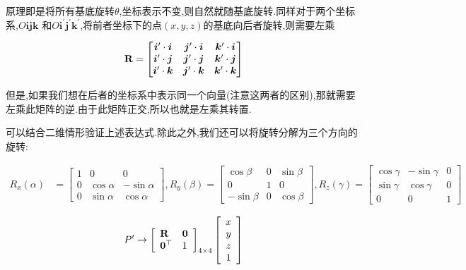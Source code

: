 原理即是将所有基底旋转$\theta$,坐标表示不变,则自然就随基底旋转.同样对于两个坐标系,$O\bm i \bm j \bm k$
和$O \bm i^\prime \bm j^\prime \bm k^\prime$,将前者坐标下的点$(x, y, z)$的基底向后者旋转,则需要左乘

\begin{equation}
	\bold{R} = \begin{bmatrix}
		\bm i^\prime \cdot \bm i  & \bm j^\prime \cdot \bm i & \bm k^\prime \cdot \bm i
		\\
		\bm i^\prime \cdot \bm j  & \bm j^\prime \cdot \bm j & \bm k^\prime \cdot \bm j
		\\
		\bm i^\prime \cdot \bm k  & \bm j^\prime \cdot \bm k & \bm k^\prime \cdot \bm k
	\end{bmatrix}
\end{equation}

但是,如果我们想在后者的坐标系中表示同一个向量(注意这两者的区别),那就需要左乘此矩阵的逆.由于此矩阵正交,所以也就是左乘其转置.

可以结合二维情形验证上述表达式.除此之外,我们还可以将旋转分解为三个方向的旋转:

\begin{equation}
	\begin{aligned}
		R_{x}(\alpha) &=\left[\begin{array}{ccc}
			1 & 0 & 0 \\
			0 & \cos \alpha & -\sin \alpha \\
			0 & \sin \alpha & \cos \alpha
		\end{array}\right],
		R_{y}(\beta) =\left[\begin{array}{ccc}
			\cos \beta & 0 & \sin \beta \\
			0 & 1 & 0 \\
			-\sin \beta & 0 & \cos \beta
		\end{array}\right],
		R_{z}(\gamma)= {\left[\begin{array}{lll}
				\cos \gamma & -\sin \gamma & 0 \\
				\sin \gamma & \cos \gamma & 0 \\
				0 & 0 & 1
			\end{array}\right] }
	\end{aligned}
\end{equation}

\begin{equation}
	P^{\prime} \rightarrow\left[\begin{array}{ll}
		\bold{R} & \bold{0} \\
		\bold{0}^\top & 1
	\end{array}\right]_{4 \times 4}\left[\begin{array}{c}
		x \\
		y \\
		z \\
		1
	\end{array}\right]
\end{equation}

